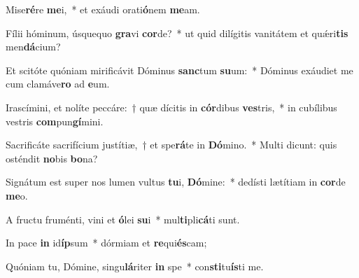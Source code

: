 \item Mise\textbf{ré}re \textbf{me}i,~* et exáudi orati\textbf{ó}nem \textbf{me}am.
\item Fílii hóminum, úsquequo \textbf{gra}vi \textbf{cor}de?~* ut quid dilígitis vanitátem et quǽri\textbf{tis} men\textbf{dá}cium?
\item Et scitóte quóniam mirificávit Dóminus \textbf{sanc}tum \textbf{su}um:~* Dóminus exáudiet me cum clamáve\textbf{ro} ad \textbf{e}um.
\item Irascímini, et nolíte peccáre:~† quæ dícitis in \textbf{cór}dibus \textbf{ves}tris,~* in cubílibus vestris \textbf{com}pun\textbf{gí}mini.
\item Sacrificáte sacrifícium justítiæ,~† et spe\textbf{rá}te in \textbf{Dó}mino.~* Multi dicunt: quis osténdit \textbf{no}bis \textbf{bo}na?
\item Signátum est super nos lumen vultus \textbf{tu}i, \textbf{Dó}mine:~* dedísti lætítiam in \textbf{cor}de \textbf{me}o.
\item A fructu fruménti, vini et \textbf{ó}lei \textbf{su}i~* mul\textbf{ti}pli\textbf{cá}ti sunt.
\item In pace \textbf{in} id\textbf{íp}sum~* dórmiam et \textbf{re}qui\textbf{és}cam;
\item Quóniam tu, Dómine, singu\textbf{lá}riter \textbf{in} spe~* con\textbf{sti}tu\textbf{ís}ti me.
